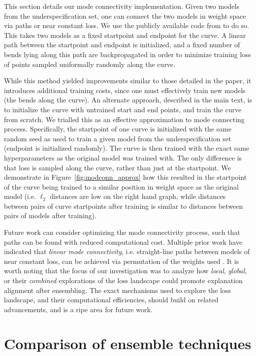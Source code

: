 This section details our mode connectivity implementation. Given two models from the underspecification set, one can connect the two models in weight space via paths or near constant loss. We use the publicly available code from \citet{garipov2018} to do so. This takes two models as a fixed startpoint and endpoint for the curve. A linear path between the startpoint and endpoint is initialized, and a fixed number of bends lying along this path are backpropagated in order to minimize training loss of points sampled uniformally randomly along the curve.

While this method yielded improvements similar to those detailed in the paper, it introduces additional training costs, since one must effectively train new models (the bends along the curve). An alternate approach, described in the main text, is to initialize the curve with untrained start and end points, and train the curve from scratch. We trialled this as an effective approximation to mode connecting process. Specifically, the startpoint of one curve is initialized with the same random seed as used to train a given model from the underspecification set (endpoint is initialized randomly). The curve is then trained with the exact same hyperparameters as the original model was trained with. The only difference is that loss is sampled along the curve, rather than just at the startpoint. We demonstrate in Figure~\ref{fig:modconn_approx} how this resulted in the startpoint of the curve being trained to a similar position in weight space as the original model (i.e. $\ell_2$ distances are low on the right hand graph, while distances between pairs of curve startpoints after training is similar to distances between pairs of models after training).

Future work can consider optimizing the mode connectivity process, such that paths can be found with reduced computational cost. Multiple prior work have indicated that \textit{linear mode connectivity}, i.e. straight-line paths between models of near constant loss, can be achieved via permutation of the weights used \citep{ainsworth2023, singh2020, tatro2020}. It is worth noting that the focus of our investigation was to analyze how \textit{local}, \textit{global}, or their \textit{combined} explorations of the loss landscape could promote explanation alignment after ensembling. The exact mechanisms used to explore the loss landscape, and their computational efficiencies, should build on related advancements, and is a ripe area for future work.

\section{Comparison of ensemble techniques}
\label{app:experiments}

